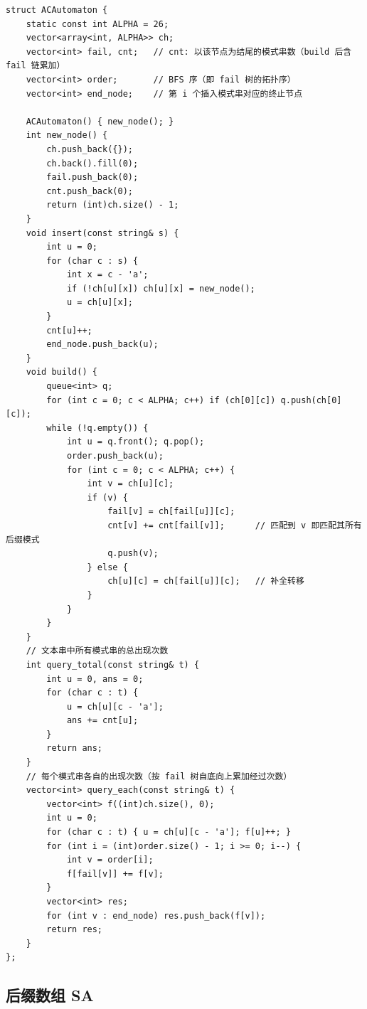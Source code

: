 \begin{lstlisting}
struct ACAutomaton {
    static const int ALPHA = 26;
    vector<array<int, ALPHA>> ch;
    vector<int> fail, cnt;   // cnt: 以该节点为结尾的模式串数（build 后含 fail 链累加）
    vector<int> order;       // BFS 序（即 fail 树的拓扑序）
    vector<int> end_node;    // 第 i 个插入模式串对应的终止节点

    ACAutomaton() { new_node(); }
    int new_node() {
        ch.push_back({});
        ch.back().fill(0);
        fail.push_back(0);
        cnt.push_back(0);
        return (int)ch.size() - 1;
    }
    void insert(const string& s) {
        int u = 0;
        for (char c : s) {
            int x = c - 'a';
            if (!ch[u][x]) ch[u][x] = new_node();
            u = ch[u][x];
        }
        cnt[u]++;
        end_node.push_back(u);
    }
    void build() {
        queue<int> q;
        for (int c = 0; c < ALPHA; c++) if (ch[0][c]) q.push(ch[0][c]);
        while (!q.empty()) {
            int u = q.front(); q.pop();
            order.push_back(u);
            for (int c = 0; c < ALPHA; c++) {
                int v = ch[u][c];
                if (v) {
                    fail[v] = ch[fail[u]][c];
                    cnt[v] += cnt[fail[v]];      // 匹配到 v 即匹配其所有后缀模式
                    q.push(v);
                } else {
                    ch[u][c] = ch[fail[u]][c];   // 补全转移
                }
            }
        }
    }
    // 文本串中所有模式串的总出现次数
    int query_total(const string& t) {
        int u = 0, ans = 0;
        for (char c : t) {
            u = ch[u][c - 'a'];
            ans += cnt[u];
        }
        return ans;
    }
    // 每个模式串各自的出现次数（按 fail 树自底向上累加经过次数）
    vector<int> query_each(const string& t) {
        vector<int> f((int)ch.size(), 0);
        int u = 0;
        for (char c : t) { u = ch[u][c - 'a']; f[u]++; }
        for (int i = (int)order.size() - 1; i >= 0; i--) {
            int v = order[i];
            f[fail[v]] += f[v];
        }
        vector<int> res;
        for (int v : end_node) res.push_back(f[v]);
        return res;
    }
};
\end{lstlisting}

\subsection{后缀数组 SA}

